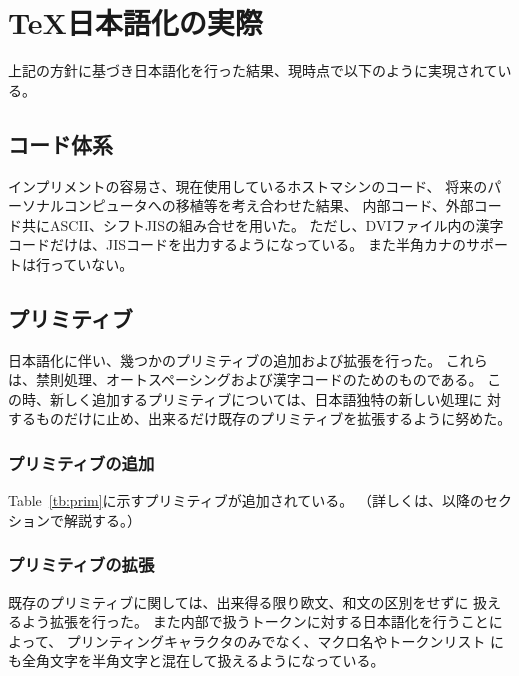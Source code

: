 \section{\TeX 日本語化の実際}
上記の方針に基づき日本語化を行った結果、現時点で以下のように実現されている。
%
\subsection{コード体系}
インプリメントの容易さ、現在使用しているホストマシンのコード、
将来のパーソナルコンピュータへの移植等を考え合わせた結果、
内部コード、外部コード共にASCII、シフトJISの組み合せを用いた。
ただし、DVIファイル内の漢字コードだけは、JISコードを出力するようになっている。
また半角カナのサポートは行っていない。
%
\subsection{プリミティブ}
日本語化に伴い、幾つかのプリミティブの追加および拡張を行った。
これらは、禁則処理、オートスペーシングおよび漢字コードのためのものである。
この時、新しく追加するプリミティブについては、日本語独特の新しい処理に
対するものだけに止め、出来るだけ既存のプリミティブを拡張するように努めた。
%
\subsubsection{プリミティブの追加}
\label{tbpri}
Table~\ref{tb:prim}に示すプリミティブが追加されている。
（詳しくは、以降のセクションで解説する。）
%
\subsubsection{プリミティブの拡張}
既存のプリミティブに関しては、出来得る限り欧文、和文の区別をせずに
扱えるよう拡張を行った。
また内部で扱うトークンに対する日本語化を行うことによって、
プリンティングキャラクタのみでなく、マクロ名やトークンリスト
にも全角文字を半角文字と混在して扱えるようになっている。

